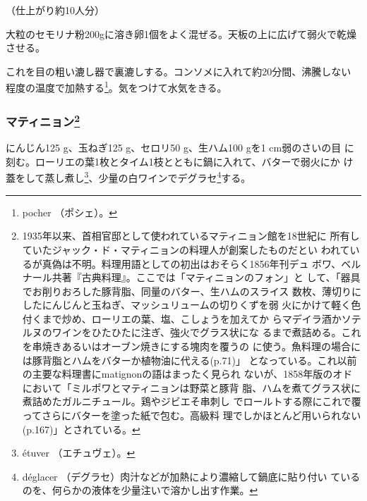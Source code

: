 \begin{recette}
（仕上がり約10人分）

大粒のセモリナ粉200gに溶き卵1個をよく混ぜる。天板の上に広げて弱火で乾燥させる。

これを目の粗い漉し器で裏漉しする。コンソメに入れて約20分間、沸騰しない
程度の温度で加熱する\footnote{pocher （ポシェ）。}。気をつけて水気をきる。

\maeaki

\hypertarget{matignon}{%
\subsubsection[マティニョン]{\texorpdfstring{マティニョン\footnote{1935年以来、首相官邸として使われているマティニョン館を18世紀に
  所有していたジャック・ド・マティニョンの料理人が創案したものだとい
  われているが真偽は不明。料理用語としての初出はおそらく1856年刊デュ
  ボワ、ベルナール共著『古典料理』。ここでは「マティニョンのフォン」と
  して、「器具でお削りおろした豚背脂、同量のバター、生ハムのスライス
  数枚、薄切りにしたにんじんと玉ねぎ、マッシュリュームの切りくずを弱
  火にかけて軽く色付くまで炒め、ローリエの葉、塩、こしょうを加えてか
  らマデイラ酒かソテルヌのワインをひたひたに注ぎ、強火でグラス状にな
  るまで煮詰める。これを串焼きあるいはオーブン焼きにする塊肉を覆うの
  に使う。魚料理の場合には豚背脂とハムをバターか植物油に代える(p.71)」
  となっている。これ以前の主要な料理書にmatignonの語はまったく見られ
  ないが、1858年版のオドにおいて「ミルポワとマティニョンは野菜と豚背
  脂、ハムを煮てグラス状に煮詰めたガルニチュール。鶏やジビエそ串刺し
  でロールトする際にこれで覆ってさらにバターを塗った紙で包む。高級料
  理でしかほとんど用いられない(p.167)」とされている。}}{マティニョン}}\label{matignon}}


 

にんじん125 g、玉ねぎ125 g、セロリ50 g、生ハム100 gを1 cm弱のさいの目
に刻む。ローリエの葉1枚とタイム1枝とともに鍋に入れて、バターで弱火にか
け蓋をして蒸し煮し\footnote{étuver （エチュヴェ）。}、少量の白ワインでデグラセ\footnote{déglacer
  （デグラセ）肉汁などが加熱により濃縮して鍋底に貼り付い
  ているのを、何らかの液体を少量注いで溶かし出す作業。}する。

\maeaki


\end{recette}

